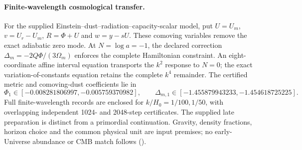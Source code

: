 \paragraph{Finite-wavelength cosmological transfer.}
For the supplied Einstein--dust--radiation--capacity-scalar model, put
$U=U_m$, $v=U_r-U_m$, $R=\Phi+U$ and $w=y-sU$.
These comoving variables remove the exact adiabatic zero mode. At
$N=\log a=-1$, the declared correction
$\Delta_m=-2Q\Phi/(3\Omega_m)$ enforces the complete Hamiltonian
constraint. An eight-coordinate affine interval equation transports the
$k^2$ response to $N=0$; the exact variation-of-constants equation retains
the complete $k^4$ remainder. The certified metric and comoving-dust
coefficients lie in
\[
 \Phi_1\in[-0.008281806997,-0.005759370982],\qquad
 \Delta_{m,1}\in[-1.455879943233,-1.454618725225].
\]
Full finite-wavelength records are enclosed for $k/H_0=1/100,1/50$,
with overlapping independent 1024- and 2048-step certificates.
The supplied late preparation is distinct from a primordial continuation.
Gravity, density fractions, horizon choice and the common physical unit
are input premises; no early-Universe abundance or CMB match follows
().

